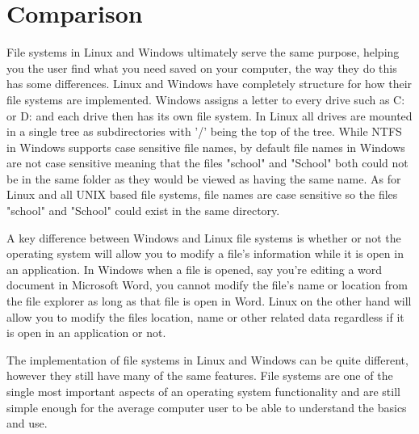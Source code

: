 \documentclass[10pt,serif,draftclsnofoot,onecolumn]{IEEEtran}
\begin{document}
	\section{Comparison}
	\par
			File systems in Linux and Windows ultimately serve the same purpose, helping you the user find what you need saved on your computer, the way they do this has some differences. Linux and Windows have completely structure for how their file systems are implemented. Windows assigns a letter to every drive such as C: or D: and each drive then has its own file system\cite{6}. In Linux all drives are mounted in a single tree as subdirectories with '/' being the top of the tree. While NTFS in Windows supports case sensitive file names, by default  file names in Windows are not case sensitive meaning that the files "school" and "School" both could not be in the same folder as they would be viewed as having the same name. As for Linux and all UNIX based file systems, file names are case sensitive so the files "school" and "School" could exist in the same directory.
	\newline
	\par
			A key difference between Windows and Linux file systems is whether or not the operating system will allow you to modify a file's information while it is open in an application. In Windows when a file is opened, say you're editing a word document in Microsoft Word, you cannot modify the file's name or location from the file explorer as long as that file is open in Word. Linux on the other hand will allow you to modify the files location, name or other related data regardless if it is open in an application or not.
	\newline
	\par
			The implementation of file systems in Linux and Windows can be quite different, however they still have many of the same features. File systems are one of the single most important aspects of an operating system functionality and are still simple enough for the average computer user to be able to understand the basics and use.
	\newpage


	
	

	
\end{document}
